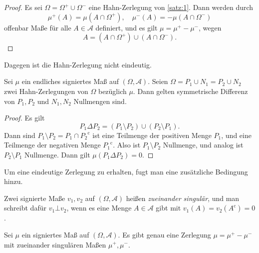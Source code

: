 \documentclass[/Users/zhangwusheng/Documents/satz von radon nikodym/satz von radon nikodym.tex]{subfiles}
\begin{document}
    \begin{proof}
        Es sei $\Omega = \Omega^{+} \cup \Omega^{-}$ eine Hahn-Zerlegung von \cref{satz:1}. Dann werden durch 
        \[\mu^{+}(A) = \mu(A \cap \Omega^{+}), \quad \mu^{-}(A) = - \mu(A \cap \Omega^{-})\]
        offenbar Maße für alle $A \in \mathcal{A}$ definiert, und es gilt $\mu = \mu^{+} - \mu^{-}$, wegen 
        \[A = (A \cap \Omega^{+}) \cup (A \cap \Omega^{-}).\]
    \end{proof}

    Dagegen ist die Hahn-Zerlegung nicht eindeutig.
    \begin{corollary}
        Sei $\mu$ ein endliches signiertes Maß auf $(\Omega, \mathcal{A})$. Seien $\Omega = P_1 \cup N_1 = P_2 \cup N_2$ 
        zwei Hahn-Zerlegungen von $\Omega$ bezüglich $\mu$. Dann gelten symmetrische Differenz
        von $P_1, P_2$ und $N_1, N_2$ Nullmengen sind. 
    \end{corollary} 

    \begin{proof}
        Es gilt 
        \[P_1 \Delta P_2 = (P_1 \setminus P_2) \cup (P_2 \setminus P_1).\]
        Dann sind $P_1 \setminus P_2 = P_1 \cap {P_2}^{\mathrm{c}}$ ist eine Teilmenge der positiven Menge $P_1$, und eine Teilmenge der negativen Menge ${P_1}^{\mathrm{c}}$. 
        Also ist $P_1 \setminus P_2$ Nullmenge, und analog ist $P_2 \setminus P_1$ Nullmenge.  
        Dann gilt $\mu(P_1 \Delta P_2) =0$.
    \end{proof}

    Um eine eindeutige Zerlegung zu erhalten, fugt man eine zusätzliche Bedingung hinzu.
    \begin{definition}
        Zwei signierte Maße $v_1, v_2$ auf $(\Omega, \mathcal{A})$ heißen \textit{zueinander singulär}, und man schreibt dafür $v_1 \bot v_2$, 
        wenn es eine Menge $A \in \mathcal{A}$ gibt mit $v_1(A)=v_2(A^{\mathrm{c}})=0$.
    \end{definition}

    \begin{mdframed}[style=mdfexample]
        \begin{corollary}\label{satz:3}
            Sei $\mu$ ein signiertes Maß auf $(\Omega, \mathcal{A})$. Es gibt genau eine Zerlegung $\mu = \mu^{+} - \mu^{-}$ mit zueinander singulären 
            Maßen $\mu^+, \mu^-$.
        \end{corollary}
    \end{mdframed}
\end{document}
